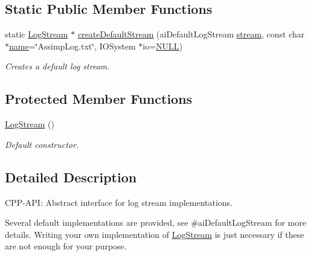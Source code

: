\subsection*{Static Public Member Functions}
\begin{DoxyCompactItemize}
\item 
static \hyperlink{class_assimp_1_1_log_stream}{Log\-Stream} $\ast$ \hyperlink{class_assimp_1_1_log_stream_a6b358a4a79b2e9ba2025e10d3e9405e3}{create\-Default\-Stream} (ai\-Default\-Log\-Stream \hyperlink{glew_8h_a10d3bc96cdfc1d478f52c13d5ffd9316}{stream}, const char $\ast$\hyperlink{fmod__codec_8h_a5c4947d4516dd7cfa3505ce3a648a4ef}{name}=\char`\"{}Assimp\-Log.\-txt\char`\"{}, I\-O\-System $\ast$io=\hyperlink{ftobjs_8h_a070d2ce7b6bb7e5c05602aa8c308d0c4}{N\-U\-L\-L})
\begin{DoxyCompactList}\small\item\em Creates a default log stream. \end{DoxyCompactList}\end{DoxyCompactItemize}
\subsection*{Protected Member Functions}
\begin{DoxyCompactItemize}
\item 
\hyperlink{class_assimp_1_1_log_stream_ac6863075fc4a6fcffd76ad6af80c18bc}{Log\-Stream} ()
\begin{DoxyCompactList}\small\item\em Default constructor. \end{DoxyCompactList}\end{DoxyCompactItemize}


\subsection{Detailed Description}
C\-P\-P-\/\-A\-P\-I\-: Abstract interface for log stream implementations. 

Several default implementations are provided, see \#ai\-Default\-Log\-Stream for more details. Writing your own implementation of \hyperlink{class_assimp_1_1_log_stream}{Log\-Stream} is just necessary if these are not enough for your purpose. 

